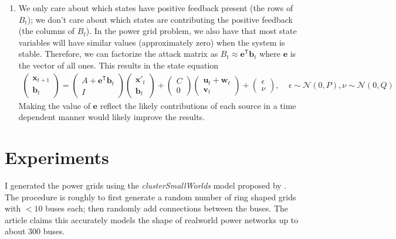 \documentclass{article}
\newcommand{\normal}[2]{\ensuremath{\mathcal{N}\left({{#1}},{{#2}}\right)}}
\newcommand{\trans}[1]{\ensuremath{{#1}^{\mathsf{T}}}}
\newcommand{\e}{\mathbf{e}}
\newcommand{\bb}{\mathbf{b}}
\newcommand{\w}{\mathbf{w}}
\newcommand{\x}{\mathbf{x}}
\newcommand{\uu}{\mathbf{u}}
\newcommand{\vv}{\mathbf{v}}
\begin{document}
\begin{enumerate}
\item
We only care about which states have positive feedback present (the rows of $B_t$);
we don't care about which states are contributing the positive feedback (the columns of $B_t$).
In the power grid problem, we also have that most state variables will have similar values (approximately zero) when the system is stable.
Therefore, we can factorize the attack matrix as $B_t \approx \trans\e\bb_t$ where $\e$ is the vector of all ones.
This results in the state equation
\begin{align}
\begin{pmatrix}
\x_{t+1} \\
\bb_t
\end{pmatrix}
=
\begin{pmatrix}
A + \trans\e\bb_t \\
I
\end{pmatrix}
\begin{pmatrix}
\x'_t \\
\bb_t
\end{pmatrix}
+
\begin{pmatrix}
C \\
0
\end{pmatrix}
\begin{pmatrix}
\uu_t + \w_t\\
\vv_t
\end{pmatrix}
+
\begin{pmatrix}
\epsilon \\
\nu
\end{pmatrix}
 ,~~~~~ \epsilon \sim \normal{0}{P}
 , \nu\sim\normal{0}{Q}
\end{align}
Making the value of $\e$ reflect the likely contributions of each source in a time dependent manner would likely improve the results.
\end{enumerate}

\section{Experiments}

I generated the power grids using the \emph{clusterSmallWorlds} model proposed by \cite{wang2010generating}.
The procedure is roughly to first generate a random number of ring shaped grids with $<10$ buses each;
then randomly add connections between the buses.
The article claims this accurately models the shape of realworld power networks up to about 300 buses.
\end{document}
